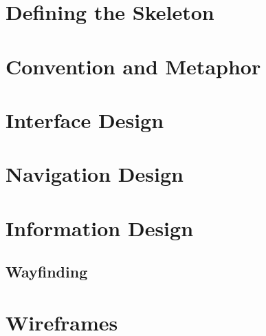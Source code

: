 \section{Defining the Skeleton}
\section{Convention and Metaphor}
\section{Interface Design}
\section{Navigation Design}
\section{Information Design}
\subsection{Wayfinding}
\section{Wireframes}